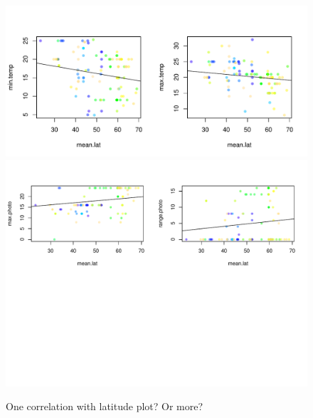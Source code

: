\documentclass[11pt,letter]{article}
\begin{document}
\begin{figure}[t!]
\centering
\includegraphics[width=1\textwidth]{..//..//analyses/limitingcues/figures/tempxlatminmaxcorr.pdf}
\includegraphics[width=1\textwidth]{..//..//analyses/limitingcues/figures/photoxlatcorr2plots.pdf}
\caption{One correlation with latitude plot? Or more?}
  \label{fig:lat}
\end{figure}
\clearpage
\end{document}
